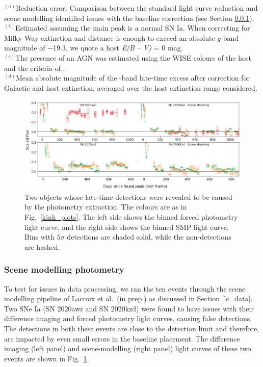 \documentclass[a4paper,oneside,12pt, class=Latex/Classes/PhDthesisPSnPDF, crop=false]{standalone}
\begin{document}
\begin{table}
{\begin{tabular}{lccccccccccccc}
   \hline
 \end{tabular}}
 \label{alt_trans_res}
\begin{flushleft}
$^{(a)}$Reduction error: Comparison between the standard light curve reduction and scene modelling identified issues with the baseline correction (see Section \ref{sec:scene_modelling}).\\
$^{(b)}$Estimated assuming the main peak is a normal SN Ia. When correcting for Milky Way extinction and distance is enough to exceed an absolute $g$-band magnitude of $-$19.3, we quote a host \textit{E(B -- V)} = 0 mag. \\
$^{(c)}$The presence of an AGN was estimated using the WISE colours of the host and the criteria of \cite{WISE_crit}.\\
$^{(d)}$Mean absolute magnitude of the \ztfr-band late-time excess after correction for Galactic and host extinction, averaged over the host extinction range considered.\\
\end{flushleft}
\end{table} 

\begin{figure}
 \centering
 \includegraphics[width=\textwidth]{../Images/chapter_3/other_red_err_plots.png}
 \caption{Two objects whose late-time detections were revealed to be caused by the photometry extraction. The colours are as in Fig.~\ref{kink_plots}. The left side shows the binned forced photometry light curve, and the right side shows the binned SMP light curve. Bins with $5\sigma$ detections are shaded solid, while the non-detections are hashed.}
 \label{other_red_errs}
\end{figure}


\subsubsection{Scene modelling photometry}
\label{sec:scene_modelling}
To test for issues in data processing, we ran the ten events through the scene modelling pipeline of Lacroix et al.~(in prep.) as discussed in Section \ref{lc_data}. Two SNe Ia (SN 2020awr and SN 2020kzd) were found to have issues with their difference imaging and forced photometry light curves, causing false detections. The detections in both these events are close to the detection limit and therefore, are impacted by even small errors in the baseline placement. The difference imaging (left panel) and scene-modelling (right panel) light curves of these two events are shown in Fig.~\ref{other_red_errs}. 
\end{document}
